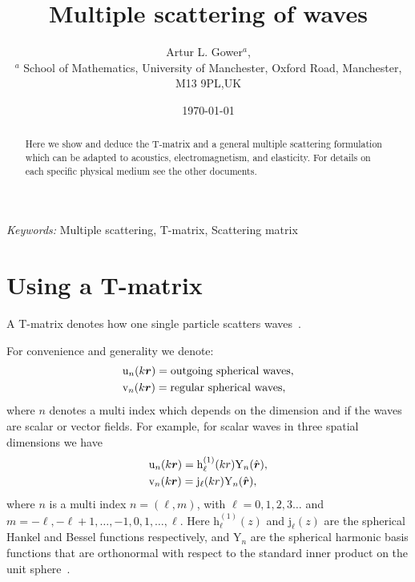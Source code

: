 \documentclass[ 12pt, a4paper]{article}
\begin{document}
\title{Multiple scattering of waves}
\author{
Artur L. Gower$^{a}$,\\
\footnotesize{$^{a}$ School of Mathematics, University of Manchester, Oxford Road, Manchester, M13 9PL,UK}
}
\date{\today}
\maketitle

\begin{abstract}
Here we show and deduce the T-matrix and a general multiple scattering formulation which can be adapted to acoustics, electromagnetism, and elasticity. For details on each specific physical medium see the other documents.
\end{abstract}

\noindent
{\textit{Keywords:} Multiple scattering, T-matrix, Scattering matrix}

\section{Using a T-matrix}
A T-matrix denotes how one single particle scatters waves~\parencite{ganesh_far-field_2010,ganesh_algorithm_2017}.

For convenience and generality we denote:
\begin{equation}
\begin{aligned}
    & \mathrm u_{n}(k\boldsymbol{r}) = \text{outgoing spherical waves},
    \label{eqn:outgoing_waves_and_regular_waves}
    \\
    & \mathrm v_{n}(k\boldsymbol{r})= \text{regular spherical waves},
 \end{aligned}
\end{equation}
where $n$ denotes a multi index which depends on the dimension and if the waves are scalar or vector fields. For example, for scalar waves in three spatial dimensions we have 
\begin{equation}
  \begin{aligned}
      & \mathrm u_{n}(k\boldsymbol{r}) = \mathrm h^{(1)}_\ell(k r) \mathrm Y_n(\hat{\boldsymbol{r}}),
      \\
      & \mathrm v_{n}(k\boldsymbol{r})= \mathrm j_\ell(k r) \mathrm Y_n(\hat{\boldsymbol{r}}),
   \end{aligned}
  \end{equation}
  where $n$ is a multi index $n=(\ell,m)$, with $\ell=0,1,2,3\ldots$ and $m=-\ell,-\ell+1,\ldots,-1,0,1,\ldots,\ell$. Here $\mathrm h_\ell^{(1)}(z)$ and $\mathrm{j}_\ell(z)$ are the spherical Hankel and Bessel functions respectively, and $\mathrm Y_n$ are the spherical harmonic basis functions that are orthonormal with respect to the standard inner product on the unit sphere~\cite{Edmonds1974}.
\end{document}
